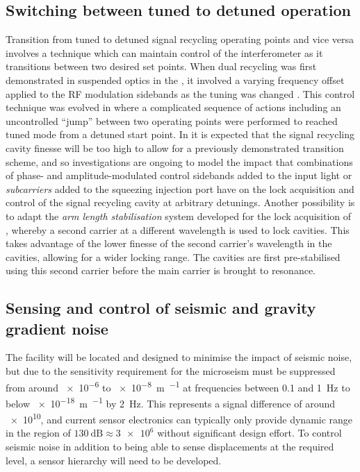 \subsection{Switching between tuned to detuned operation}
Transition from tuned to detuned signal recycling operating points and vice versa involves a technique which can maintain control of the interferometer as it transitions between two desired set points. When dual recycling was first demonstrated in suspended optics in the \GARCHINGPROTOTYPE{}, it involved a varying frequency offset applied to the \gls{RF} modulation sidebands as the tuning was changed \cite{Freise2000}. This control technique was evolved in \GEO{} where a complicated sequence of actions \cite{Grote2004} including an uncontrolled ``jump'' between two operating points \cite{Hild2007} were performed to reached tuned mode from a detuned start point. In \ETLF{} it is expected that the signal recycling cavity finesse will be too high to allow for a previously demonstrated transition scheme, and so investigations are ongoing to model the impact that combinations of phase- and amplitude-modulated control sidebands added to the input light or \emph{subcarriers} added to the squeezing injection port have on the lock acquisition and control of the signal recycling cavity at arbitrary detunings. Another possibility is to adapt the \emph{arm length stabilisation} system developed for the lock acquisition of \ALIGO{} \cite{Mullavey2012, Staley2014}, whereby a second carrier at a different wavelength is used to lock cavities. This takes advantage of the lower finesse of the second carrier's wavelength in the cavities, allowing for a wider locking range. The cavities are first pre-stabilised using this second carrier before the main carrier is brought to resonance.

\subsection{Sensing and control of seismic and gravity gradient noise}
The \ET{} facility will be located and designed to minimise the impact of seismic noise, but due to the sensitivity requirement for \ETLF{} the microseism must be suppressed from around \num{e-6} to \SI{e-8}{\meter\per\sqrthz} at frequencies between \num{0.1} and \SI{1}{\hertz} to below \SI{e-18}{\meter\per\sqrthz} by \SI{2}{\hertz}. This represents a signal difference of around \num{e10}, and current sensor electronics can typically only provide dynamic range in the region of $\SI{130}{\deci\bel} \approx \num{3e6}$ without significant design effort. To control seismic noise in addition to being able to sense displacements at the required level, a sensor hierarchy will need to be developed.

